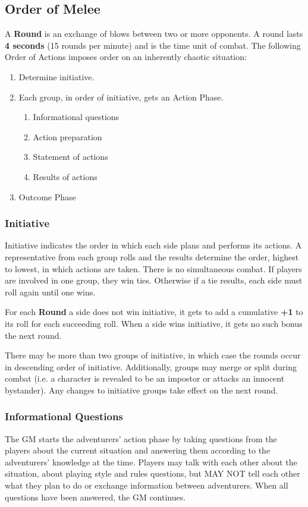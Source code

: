 \begin{multicols*}{2}
\subsection{Order of Melee}
A \textbf{Round} is an exchange of blows between two or more opponents. A round lasts \textbf{4 seconds} (15 rounds per minute) and is the time unit of combat. The following Order of Actions imposes order on an inherently chaotic situation:
\begin{enumerate}[leftmargin=12pt]
\item Determine initiative.
\item Each group, in order of initiative, gets an Action Phase.
\begin{enumerate}[leftmargin=12pt]
\item Informational questions
\item Action preparation
\item Statement of actions
\item Results of actions
\end{enumerate}
\item Outcome Phase
\end{enumerate}
\subsubsection{Initiative}
Initiative indicates the order in which each side plans and performs its actions. A representative from each group rolls  and the results determine the order, highest to lowest, in which actions are taken. There is no simultaneous combat. If players are involved in one group, they win ties. Otherwise if a tie results, each side must roll again until one wins.

For each \textbf{Round} a side does not win initiative, it gets to add a cumulative \textbf{+1} to its roll for each succeeding roll. When a side wins initiative, it gets no such bonus the next round.

There may be more than two groups of initiative, in which case the rounds occur in descending order of initiative. Additionally, groups may merge or split during combat (i.e. a character is revealed to be an impostor or attacks an innocent bystander). Any changes to initiative groups take effect on the next round. 
\subsubsection{Informational Questions}
The GM starts the adventurers' action phase by taking questions from the players about the current situation and answering them according to the adventurers' knowledge at the time. Players may talk with each other about the situation, about playing style and rules questions, but MAY NOT tell each other what they plan to do or exchange information between adventurers. When all questions have been answered, the GM continues.

\end{multicols*}
